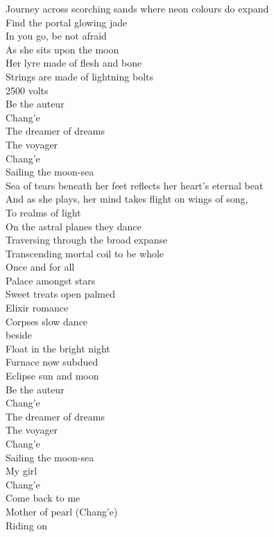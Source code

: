 Journey across scorching sands where neon colours do expand \\
Find the portal glowing jade \\
In you go, be not afraid \\
As she sits upon the moon \\
Her lyre made of flesh and bone \\
Strings are made of lightning bolts \\
2500 volts \\

Be the auteur \\
Chang'e \\
The dreamer of dreams \\
The voyager \\
Chang'e \\
Sailing the moon-sea \\

Sea of tears beneath her feet reflects her heart's eternal beat \\
And as she plays, her mind takes flight on wings of song, \\
To realms of light \\
On the astral planes they dance \\
Traversing through the broad expanse \\
Transcending mortal coil to be whole \\
Once and for all \\

Palace amongst stars \\
Sweet treats open palmed \\
Elixir romance \\
Corpses slow dance \\
 beside \\
Float in the bright night \\
Furnace now subdued \\
Eclipse sun and moon \\

Be the auteur \\
Chang'e \\
The dreamer of dreams \\
The voyager \\
Chang'e \\
Sailing the moon-sea \\
My girl \\
Chang'e \\
Come back to me \\
Mother of pearl (Chang'e) \\
Riding on  \\

